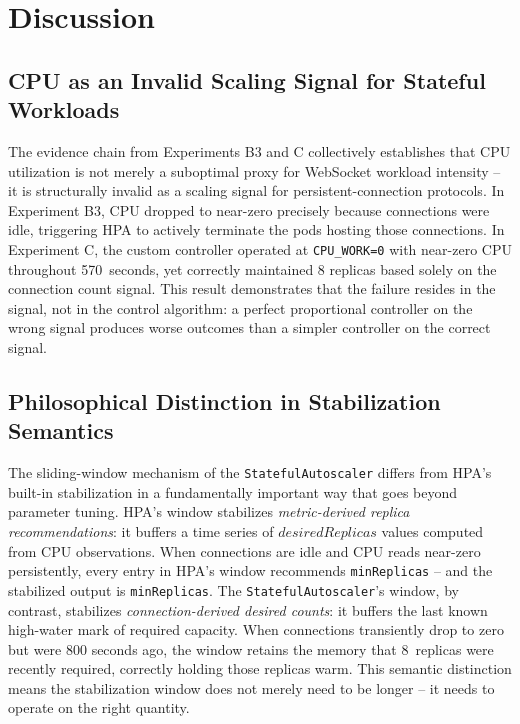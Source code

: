\documentclass[twocolumn]{svjour3}
\begin{document}
\section{Discussion}
\label{sec:discussion}

\subsection{CPU as an Invalid Scaling Signal for Stateful Workloads}

The evidence chain from Experiments B3 and C collectively establishes that CPU utilization is not merely a suboptimal proxy for WebSocket workload intensity -- it is structurally invalid as a scaling signal for persistent-connection protocols. In Experiment B3, CPU dropped to near-zero precisely because connections were idle, triggering HPA to actively terminate the pods hosting those connections. In Experiment C, the custom controller operated at \texttt{CPU\_WORK=0} with near-zero CPU throughout 570~seconds, yet correctly maintained 8 replicas based solely on the connection count signal. This result demonstrates that the failure resides in the signal, not in the control algorithm: a perfect proportional controller on the wrong signal produces worse outcomes than a simpler controller on the correct signal.

\subsection{Philosophical Distinction in Stabilization Semantics}

The sliding-window mechanism of the \texttt{StatefulAutoscaler} differs from HPA's built-in stabilization in a fundamentally important way that goes beyond parameter tuning. HPA's window stabilizes \textit{metric-derived replica recommendations}: it buffers a time series of $desiredReplicas$ values computed from CPU observations. When connections are idle and CPU reads near-zero persistently, every entry in HPA's window recommends \texttt{minReplicas} -- and the stabilized output is \texttt{minReplicas}. The \texttt{StatefulAutoscaler}'s window, by contrast, stabilizes \textit{connection-derived desired counts}: it buffers the last known high-water mark of required capacity. When connections transiently drop to zero but were 800 seconds ago, the window retains the memory that 8~replicas were recently required, correctly holding those replicas warm. This semantic distinction means the stabilization window does not merely need to be longer -- it needs to operate on the right quantity.
\end{document}
